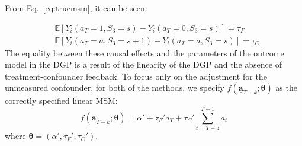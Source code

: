 From Eq.~\eqref{eq:truemsm}, it can be seen: 

\begin{align*}
        &\mathbb{E}\left[ Y_i\left(a_T = 1, S_3 = s\right) - Y_i\left(a_T = 0, S_3 = s\right) \right] = \tau_F\\
        &\mathbb{E}\left[ Y_i\left(a_T = a, S_3 = s+1\right) - Y_i\left(a_T = a, S_3 = s\right) \right] = \tau_C
\end{align*}
The equality between these causal effects and the parameters of the 
outcome model in the DGP is a result of the linearity of the DGP and 
the absence of treatment-confounder feedback. 
To focus only on the adjustment for the unmeasured confounder, for both of the methods, 
we specify $f\left(\underline{\mathbf{a}}_{T-k}; \boldsymbol{\theta} \right)$ as the correctly 
specified linear MSM:
\begin{equation}
    \label{eq:specifiedmsm}
    f\left(\underline{\mathbf{a}}_{T-k}; \boldsymbol{\theta} \right) = \alpha' + \tau_F' a_T + \tau_C' \sum_{t=T-3}^{T-1} a_t
\end{equation}
where $\boldsymbol{\theta} = (\alpha', \tau_F', \tau_C')$. 






 
 



